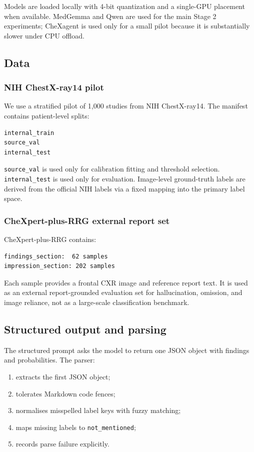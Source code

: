 Models are loaded locally with 4-bit quantization and a single-GPU placement when available. MedGemma and Qwen are used for the main Stage 2 experiments; CheXagent is used only for a small pilot because it is substantially slower under CPU offload.

\subsection{Data}

\subsubsection{NIH ChestX-ray14 pilot}

We use a stratified pilot of 1,000 studies from NIH ChestX-ray14. The manifest contains patient-level splits:

\begin{verbatim}
internal_train
source_val
internal_test
\end{verbatim}

\texttt{source\_val} is used only for calibration fitting and threshold selection. \texttt{internal\_test} is used only for evaluation. Image-level ground-truth labels are derived from the official NIH labels via a fixed mapping into the primary label space.

\subsubsection{CheXpert-plus-RRG external report set}

CheXpert-plus-RRG contains:

\begin{verbatim}
findings_section:  62 samples
impression_section: 202 samples
\end{verbatim}

Each sample provides a frontal CXR image and reference report text. It is used as an external report-grounded evaluation set for hallucination, omission, and image reliance, not as a large-scale classification benchmark.

\subsection{Structured output and parsing}

The structured prompt asks the model to return one JSON object with findings and probabilities. The parser:

\begin{enumerate}
\item extracts the first JSON object;
\item tolerates Markdown code fences;
\item normalises misspelled label keys with fuzzy matching;
\item maps missing labels to \texttt{not\_mentioned};
\item records parse failure explicitly.
\end{enumerate}

